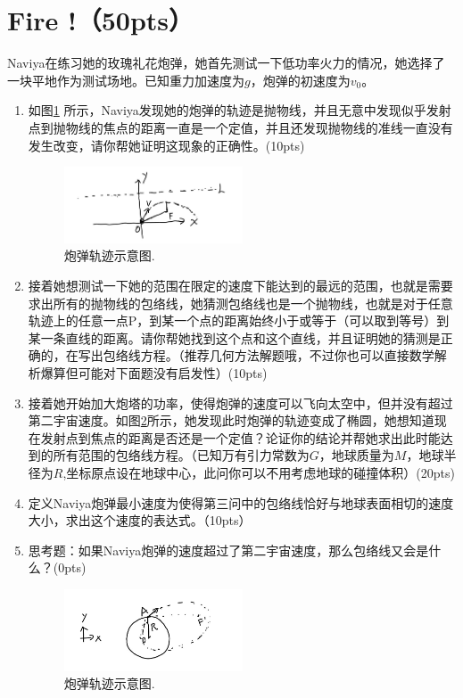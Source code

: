 \section{Fire !（50pts）}
Naviya在练习她的玫瑰礼花炮弹，她首先测试一下低功率火力的情况，她选择了一块平地作为测试场地。已知重力加速度为\(g\)，炮弹的初速度为\(v_{0}\)。
\begin{enumerate}
	\item 如图\ref{fire1} 所示，Naviya发现她的炮弹的轨迹是抛物线，并且无意中发现似乎发射点到抛物线的焦点的距离一直是一个定值，并且还发现抛物线的准线一直没有发生改变，请你帮她证明这现象的正确性。(10pts)
	\begin{figure}[htbp]
	\centering
	\includegraphics[width=0.5\textwidth]{fire1}
	\caption{炮弹轨迹示意图.}
	\label{fire1}
	\end{figure}
	\item 接着她想测试一下她的范围在限定的速度下能达到的最远的范围，也就是需要求出所有的抛物线的包络线，她猜测包络线也是一个抛物线，也就是对于任意轨迹上的任意一点P，到某一个点的距离始终小于或等于（可以取到等号）到某一条直线的距离。请你帮她找到这个点和这个直线，并且证明她的猜测是正确的，在写出包络线方程。（推荐几何方法解题哦，不过你也可以直接数学解析爆算但可能对下面题没有启发性）(10pts)
	\item 接着她开始加大炮塔的功率，使得炮弹的速度可以飞向太空中，但并没有超过第二宇宙速度。如图\ref{fire2}所示，她发现此时炮弹的轨迹变成了椭圆，她想知道现在发射点到焦点的距离是否还是一个定值？论证你的结论并帮她求出此时能达到的所有范围的包络线方程。（已知万有引力常数为\(G\)，地球质量为\(M\)，地球半径为\(R\),坐标原点设在地球中心，此问你可以不用考虑地球的碰撞体积）(20pts)
	\item 定义Naviya炮弹最小速度为使得第三问中的包络线恰好与地球表面相切的速度大小，求出这个速度的表达式。（10pts）
	\item 思考题：如果Naviya炮弹的速度超过了第二宇宙速度，那么包络线又会是什么？(0pts)
	\begin{figure}[htbp]
	\centering
	\includegraphics[width=0.5\textwidth]{fire2}
	\caption{炮弹轨迹示意图.}
	\label{fire2}
	\end{figure}
\end{enumerate}

